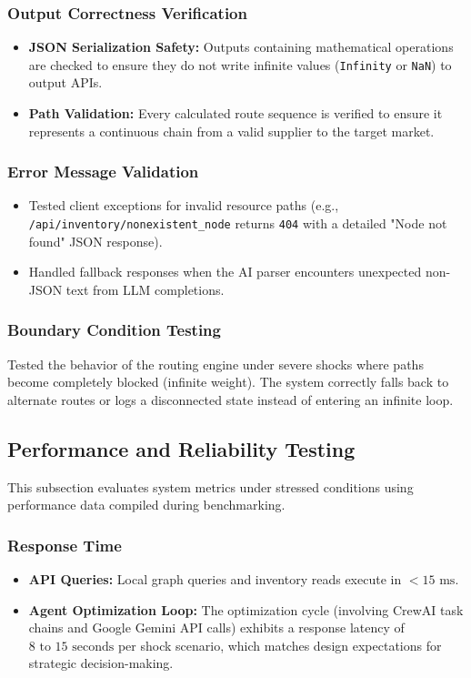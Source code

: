 \subsubsection{Output Correctness Verification}
\begin{itemize}
    \item \textbf{JSON Serialization Safety:} Outputs containing mathematical operations are checked to ensure they do not write infinite values (\texttt{Infinity} or \texttt{NaN}) to output APIs.
    \item \textbf{Path Validation:} Every calculated route sequence is verified to ensure it represents a continuous chain from a valid supplier to the target market.
\end{itemize}

\subsubsection{Error Message Validation}
\begin{itemize}
    \item Tested client exceptions for invalid resource paths (e.g., \texttt{/api/inventory/nonexistent\_node} returns \texttt{404} with a detailed "Node not found" JSON response).
    \item Handled fallback responses when the AI parser encounters unexpected non-JSON text from LLM completions.
\end{itemize}

\subsubsection{Boundary Condition Testing}
Tested the behavior of the routing engine under severe shocks where paths become completely blocked (infinite weight). The system correctly falls back to alternate routes or logs a disconnected state instead of entering an infinite loop.

\subsection[Performance and Reliability Testing]{Performance and Reliability Testing}
This subsection evaluates system metrics under stressed conditions using performance data compiled during benchmarking.

\subsubsection{Response Time}
\begin{itemize}
    \item \textbf{API Queries:} Local graph queries and inventory reads execute in \textbf{$< 15\text{ ms}$}.
    \item \textbf{Agent Optimization Loop:} The optimization cycle (involving CrewAI task chains and Google Gemini API calls) exhibits a response latency of \textbf{$8\text{ to }15\text{ seconds}$} per shock scenario, which matches design expectations for strategic decision-making.
\end{itemize}

